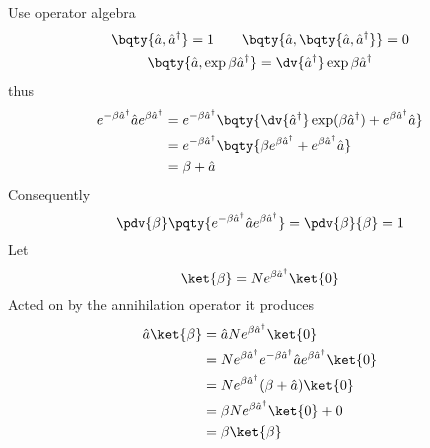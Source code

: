 \documentclass[12pt]{article}
\begin{document}
        \subsection{} Use operator algebra \begin{gather*}
           \bqty{\hat{a},\hat{a}^\dagger } = 1\qquad \bqty{\hat{a},\bqty{\hat{a}, \hat{a}^\dagger }} = 0\\
           \bqty{\hat{a}, \exp{ \beta\hat{a}^\dagger} } =  \dv{\hat{a}^\dagger } \exp{ \beta \hat{a}^\dagger }
        \end{gather*}
        thus
        \begin{align*}
            e^{ - \beta \hat{a}^\dagger }\hat{a}e^{\beta \hat{a}^\dagger} &= e^{ - \beta \hat{a}^\dagger }\bqty{\dv{\hat{a}^\dagger }\exp(\beta \hat{a}^\dagger ) + e^{\beta \hat{a}^\dagger} \hat{a} }\\
            &= e^{ - \beta \hat{a}^\dagger }\bqty{\beta e^{\beta \hat{a}^\dagger } + e^{\beta \hat{a}^\dagger} \hat{a} }\\
            &= \beta + \hat{a}
        \end{align*}
        Consequently \[
            \pdv{\beta} \pqty{e^{ - \beta \hat{a}^\dagger }\hat{a}e^{\beta \hat{a}^\dagger}} = \pdv{\beta}{\beta} = 1
        \]
        Let \[
            \ket{\beta} = N e^{\beta \hat{a}^\dagger } \ket{0} 
        \]
        Acted on by the annihilation operator it produces \begin{align*}
            \hat{a} \ket{\beta}
            &= \hat{a} N e^{\beta \hat{a}^\dagger } \ket{0} \\
            &= N e^{\beta \hat{a}^\dagger } e^{ - \beta \hat{a}^\dagger }\hat{a}e^{\beta \hat{a}^\dagger} \ket{0} \\
            &= N e^{\beta \hat{a}^\dagger } (\beta + \hat{a}) \ket{0} \\
            &= \beta N e^{\beta \hat{a}^\dagger }\ket{0} + 0\\
            &= \beta \ket{\beta} 
        \end{align*}
\end{document}

